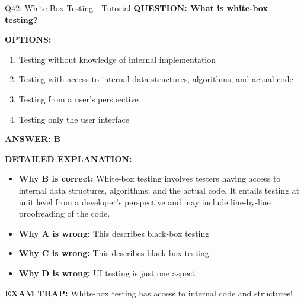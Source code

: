 \documentclass[8pt]{beamer}
\begin{document}
	\begin{frame}{Q42: White-Box Testing - Tutorial}
		\fontsize{6.5}{7.5}\selectfont
		\textbf{QUESTION: What is white-box testing?}
		
		\vspace{0.1cm}
		\textbf{OPTIONS:}
		\begin{enumerate}
			\item Testing without knowledge of internal implementation
			\item Testing with access to internal data structures, algorithms, and actual code
			\item Testing from a user's perspective
			\item Testing only the user interface
		\end{enumerate}
		
		\vspace{0.1cm}
		\textcolor{myblue}{\textbf{ANSWER: B}}
		
		\vspace{0.1cm}
		\textbf{DETAILED EXPLANATION:}
		\begin{itemize}
			\item \textbf{Why B is correct:} White-box testing involves testers having access to internal data structures, algorithms, and the actual code. It entails testing at unit level from a developer's perspective and may include line-by-line proofreading of the code.
			\item \textbf{Why A is wrong:} This describes black-box testing
			\item \textbf{Why C is wrong:} This describes black-box testing
			\item \textbf{Why D is wrong:} UI testing is just one aspect
		\end{itemize}
		
		\textcolor{myred}{\textbf{EXAM TRAP:}} White-box testing has \textcolor{myblue}{access to internal code and structures}!
	\end{frame}
	
\end{document}
